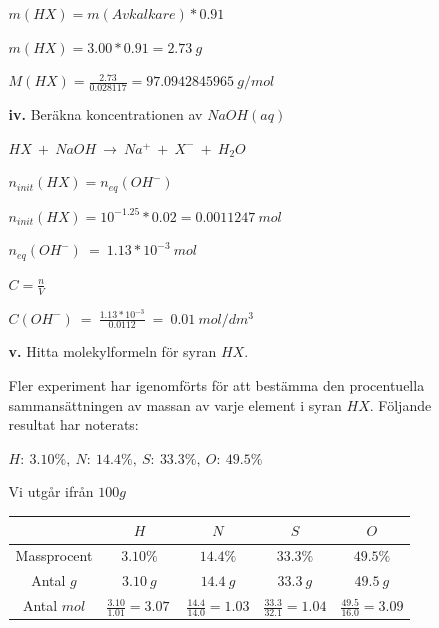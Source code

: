 \documentclass[12pt, letterpaper, twoside]{article}
\begin{document}
\begin{flushleft}
\begin{itemize}
\begin{itemize}
$ m(HX)=m(Avkalkare)*0.91 $

$ m(HX)=3.00*0.91=2.73\ g $

$ M(HX)=\frac{2.73}{0.028117}=97.0942845965\ g/mol $

\hfill
\item[\textbf{iv.}] Beräkna koncentrationen av $ NaOH(aq) $

$ HX\ +\ NaOH\ \rightarrow\ Na^+\ +\ X^-\ +\ H_2O $

$ n_{init}(HX)=n_{eq}(OH^-) $

$ n_{init}(HX)= 10^{-1.25}*0.02=0.0011247\ mol $

$ n_{eq}(OH^-)\ =\ 1.13*10^{-3}\ mol $

$ C=\frac{n}{V} $

$ C(OH^-)\ =\ \frac{1.13*10^{-3}}{0.0112}\ =\ 0.01\ mol/dm^3 $

\hfill
\item[\textbf{v.}] Hitta molekylformeln för syran $ HX $.

\hfill

Fler experiment har igenomförts för att bestämma den procentuella sammansättningen
av massan av varje element i syran $ HX $. Följande resultat har noterats:\\

\hfill

$ H:\ 3.10\%,\ N:\ 14.4\%,\ S:\ 33.3\%,\ O:\ 49.5\% $

\hfill

Vi utgår ifrån $ 100 g $

\renewcommand{\arraystretch}{1.5}
\begin{tabular}{ |c|c|c|c|c| }
 \hline
  & $ H $ & $ N $ & $ S $ & $ O $ \\
 \hline
 Massprocent & $ 3.10\% $ & $ 14.4\% $ & $ 33.3\% $ & $ 49.5\% $ \\
 \hline
 Antal $ g $ & $ 3.10\ g $ & $ 14.4\ g $ & $ 33.3\ g $ & $ 49.5\ g $ \\
 \hline
 Antal $ mol $ & $ \frac{3.10}{1.01}=3.07\ $ & $ \frac{14.4}{14.0}=1.03 $ & $ \frac{33.3}{32.1}=1.04 $ & $ \frac{49.5}{16.0}=3.09 $ \\
 \hline
\end{tabular}


\end{itemize}
\end{itemize}
\end{flushleft}
\end{document}
